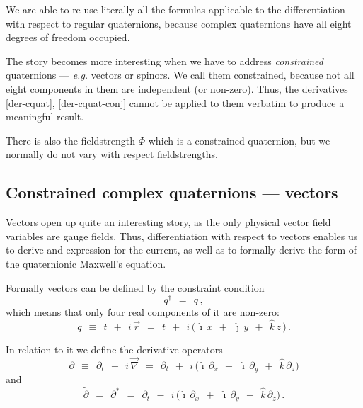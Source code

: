 \documentclass[epsfig,12pt]{article}
\newcommand{\p}{\partial}
\newcommand{\wt}{\widetilde}
\newcommand{\ii}{\hat\imath}
\newcommand{\jj}{\hat\jmath}
\newcommand{\kk}{\hat k}
\begin{document}
	We are able to re-use literally all the formulas applicable to the differentiation
	with respect to regular quaternions, because complex quaternions have all
	eight degrees of freedom occupied.

	The story becomes more interesting when we have to address \emph{constrained}
	quaternions --- \emph{e.g.} vectors or spinors.
	We call them constrained, because not all eight components in them are independent
	(or non-zero).
	Thus, the derivatives \eqref{der-cquat}, \eqref{der-cquat-conj} cannot be applied to
	them verbatim to produce a meaningful result.

	There is also the fieldstrength $ \Phi $ which is a constrained quaternion,
	but we normally do not vary with respect fieldstrengths.
	

\subsection{Constrained complex quaternions --- vectors}

	Vectors open up quite an interesting story, as the only physical vector
	field variables are gauge fields.
	Thus, differentiation with respect to vectors enables us to derive
	and expression for the current, as well as to formally derive the form 
	of the quaternionic Maxwell's equation.

	Formally vectors can be defined by the constraint condition
\begin{equation}
	q^\dag	~~=~~	q\,,
\end{equation}
	which means that only four real components of it are non-zero:
\begin{equation}
	q	~~\equiv~~	t  ~~+~~  i\,\vec r
		~~=~~		t  ~~+~~  i\,\big(\, \ii\,x  ~~+~~  \jj\,y  ~~+~~  \kk\,z \,\big)\,.
\end{equation}

	In relation to it we define the derivative operators
\begin{equation}
	\p	~~\equiv~~	\p_t  ~~+~~  i\,\vec\nabla
		~~=~~		\p_t  ~~+~~  i\,\big( \ii\,\p_x  ~~+~~  \ii\,\p_y  ~~+~~  \kk\,\p_z \big)
\end{equation}
	and
\begin{equation}
	\wt\p	~~=~~	\p^*
		~~=~~	\p_t  ~~-~~  i\,\big( \ii\,\p_x  ~~+~~  \ii\,\p_y  ~~+~~  \kk\,\p_z \big)\,.
\end{equation}
\end{document}
